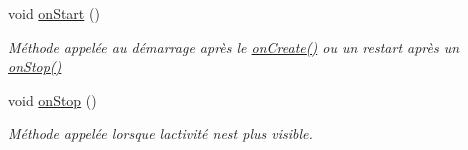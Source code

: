 \begin{DoxyCompactItemize}
void \hyperlink{classcom_1_1example_1_1bee__honeyt_1_1_i_h_m_mobile_abab25414f97d4793152b39c2deb8365b}{on\+Start} ()
\begin{DoxyCompactList}\small\item\em Méthode appelée au démarrage après le \hyperlink{classcom_1_1example_1_1bee__honeyt_1_1_i_h_m_mobile_af487b0250bfc0e873fe3a4f495c3ef5e}{on\+Create()} ou un restart après un \hyperlink{classcom_1_1example_1_1bee__honeyt_1_1_i_h_m_mobile_ad341d4dd8d326f2ecdca7a5447c3f8a4}{on\+Stop()} \end{DoxyCompactList}\item 
void \hyperlink{classcom_1_1example_1_1bee__honeyt_1_1_i_h_m_mobile_ad341d4dd8d326f2ecdca7a5447c3f8a4}{on\+Stop} ()
\begin{DoxyCompactList}\small\item\em Méthode appelée lorsque l\textquotesingle{}activité n\textquotesingle{}est plus visible. \end{DoxyCompactList}\end{DoxyCompactItemize}
